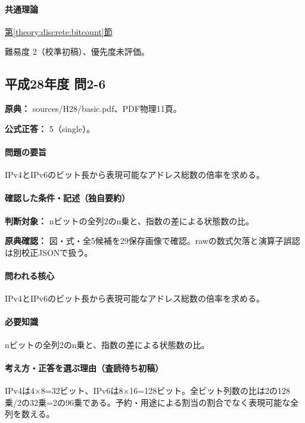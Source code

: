 \paragraph{共通理論} \hyperref[theory:discrete:bitcount]{第\ref*{theory:discrete:bitcount}節}

\par 難易度 2（校準初稿）、優先度未評価。

\subsection{平成28年度 問2-6}
\label{q:h28-reg-basic-2-6}

\noindent\textbf{原典：} sources/H28/basic.pdf、PDF物理11頁。

\textbf{公式正答：} 5（single）。

\paragraph{問題の要旨} IPv4とIPv6のビット長から表現可能なアドレス総数の倍率を求める。

\paragraph{確認した条件・記述（独自要約）}\mbox{}\par

\noindent\textbf{判断対象：} nビットの全列2のn乗と、指数の差による状態数の比。\par

\noindent\textbf{原典確認：} 図・式・全5候補を29保存画像で確認。rawの数式欠落と演算子誤認は別校正JSONで扱う。\par

\paragraph{問われる核心} IPv4とIPv6のビット長から表現可能なアドレス総数の倍率を求める。

\paragraph{必要知識} nビットの全列2のn乗と、指数の差による状態数の比。

\paragraph{考え方・正答を選ぶ理由（査読待ち初稿）} IPv4は4×8=\allowbreak{}32ビット、IPv6は8×16=\allowbreak{}128ビット。全ビット列数の比は2の128乗/2の32乗=2の96乗である。予約・用途による割当の割合でなく表現可能な全列を数える。

